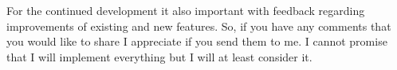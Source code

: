 \documentclass[a4paper]{scrreprt}
\begin{document}
For the continued development it also important with feedback regarding
improvements of existing and new features. So, if you have any comments that you
would like to share I appreciate if you send them to me. I cannot promise that I
will implement everything but I will at least consider it.



\end{document}
